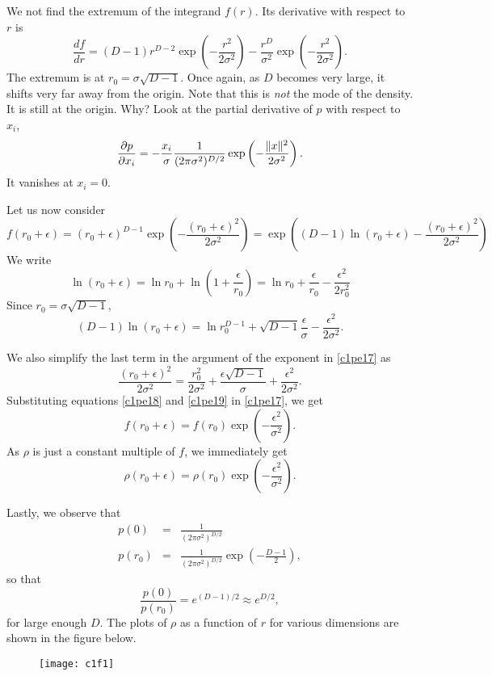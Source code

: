 \begin{enumerate}
We not find the extremum of the integrand $f(r)$. Its derivative with respect to $r$
is
\[
\frac{df}{dr} = (D-1)r^{D-2}\exp\left(-\frac{r^2}{2\sigma^2}\right) - \frac{r^D}{\sigma^2}\exp\left(-\frac{r^2}{2\sigma^2}\right).
\]
The extremum is at $r_0 = \sigma\sqrt{D - 1}$. Once again, as $D$ becomes very large, it 
shifts very far away from the origin. Note that this is \emph{not} the mode of the
density. It is still at the origin. Why? Look at the partial derivative of $p$ with
respect to $x_i$,
\[
\frac{\partial p}{\partial x_i} = -\frac{x_i}{\sigma}\frac{1}{(2\pi\sigma^2)^{D/2}}\exp\left(-\frac{\lVert x\rVert^2}{2\sigma^2}\right).
\]
It vanishes at $x_i = 0$.

Let us now consider 
\begin{equation}\label{c1pe17}
f(r_0 + \epsilon) = (r_0 + \epsilon)^{D-1}\exp\left(-\frac{(r_0 + \epsilon)^2}{2\sigma^2}\right)
= \exp\left((D-1)\ln(r_0 + \epsilon) -\frac{(r_0 + \epsilon)^2}{2\sigma^2}\right)
\end{equation}
We write
\[
\ln(r_0 + \epsilon) = \ln r_0 + \ln\left(1 + \frac{\epsilon}{r_0}\right) = \ln r_0 + \frac{\epsilon}{r_0} - \frac{\epsilon^2}{2r_0^2}
\]
Since $r_0 = \sigma\sqrt{D - 1}$,
\begin{equation}\label{c1pe18}
(D - 1)\ln(r_0 + \epsilon) = \ln r_0^{D-1} + \sqrt{D-1}\frac{\epsilon}{\sigma} - \frac{\epsilon^2}{2\sigma^2}.
\end{equation}

We also simplify the last term in the argument of the exponent in \eqref{c1pe17} as
\begin{equation}\label{c1pe19}
\frac{(r_0 + \epsilon)^2}{2\sigma^2} = \frac{r_0^2}{2\sigma^2} + \frac{\epsilon\sqrt{D-1}}{\sigma} + \frac{\epsilon^2}{2\sigma^2}.
\end{equation}
Substituting equations \eqref{c1pe18} and \eqref{c1pe19} in \eqref{c1pe17}, we get
\[
f(r_0 + \epsilon) = f(r_0)\exp\left(-\frac{\epsilon^2}{\sigma^2}\right).
\]
As $\rho$ is just a constant multiple of $f$, we immediately get
\[
\rho(r_0 + \epsilon) = \rho(r_0)\exp\left(-\frac{\epsilon^2}{\sigma^2}\right).
\]

Lastly, we observe that 
\begin{eqnarray*}
p(0) &=& \frac{1}{(2\pi\sigma^2)^{D/2}} \\
p(r_0) &=&\frac{1}{(2\pi\sigma^2)^{D/2}}\exp\left(-\frac{D - 1}{2}\right), 
\end{eqnarray*}
so that
\[
\frac{p(0)}{p(r_0)} = e^{(D-1)/2} \approx e^{D/2},
\]
for large enough $D$. The plots of $\rho$ as a function of $r$ for various dimensions are
shown in the figure below.
\begin{figure}[ht]
\texttt{[image: c1f1]}
\end{figure}


\end{enumerate}
